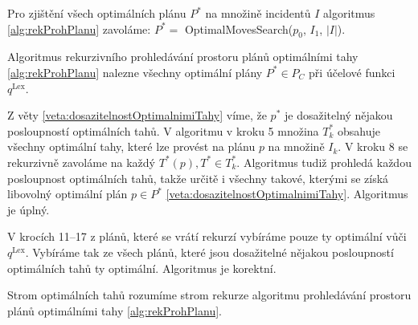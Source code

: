 Pro zjištění všech optimálních plánu $P^*$ na množině incidentů $I$ algoritmus \ref{alg:rekProhPlanu} zavoláme: $P^* = $ OptimalMovesSearch($p_0$, $I_1$, $|I|$).

\begin{veta}\label{}
  Algoritmus rekurzivního prohledávání prostoru plánů optimálními tahy \ref{alg:rekProhPlanu} nalezne všechny optimální plány $P^* \in P_C$ při účelové funkci $q^{\text{Lex}}$.
\end{veta}
\begin{dukaz}
  Z věty \ref{veta:dosazitelnostOptimalnimiTahy} víme, že $p^*$ je dosažitelný nějakou posloupností optimálních tahů. 
  V algoritmu v kroku 5 množina $T^*_k$ obsahuje všechny optimální tahy, které lze provést na plánu $p$ na množině $I_k$.
  V kroku 8 se rekurzivně zavoláme na každý $T^*(p), T^* \in T^*_k$.
  Algoritmus tudiž prohledá každou posloupnost optimálních tahů, takže určitě i všechny takové, kterými se získá libovolný optimální plán $p \in P^*$ \ref{veta:dosazitelnostOptimalnimiTahy}.
  Algoritmus je úplný.

  V krocích 11--17 z plánů, které se vrátí rekurzí vybíráme pouze ty optimální vůči $q^{\text{Lex}}$.
  Vybíráme tak ze všech plánů, které jsou dosažitelné nějakou posloupností optimálních tahů ty optimální.
  Algoritmus je korektní.
\end{dukaz}

\begin{definice}
  Strom optimálních tahů rozumíme strom rekurze algoritmu prohledávání prostoru plánů optimálními tahy \ref{alg:rekProhPlanu}.
\end{definice}

\begin{veta}
\end{veta}
\begin{dukaz}
\end{dukaz}

\begin{veta}
\end{veta}
\begin{dukaz}

\end{dukaz}

